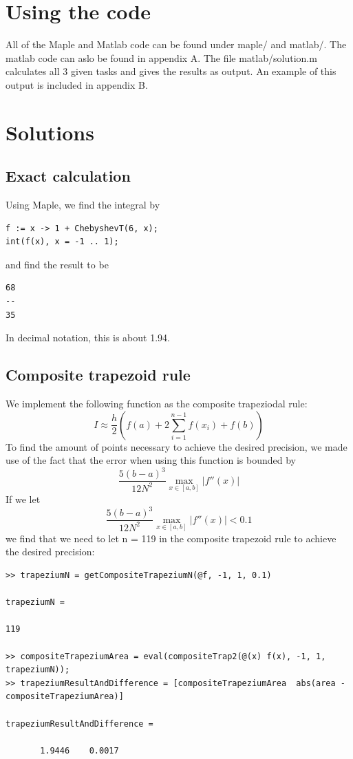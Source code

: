 \documentclass[11pt, a4paper, titlepage, openright]{article}
\begin{document}
\section{Using the code}
    All of the Maple and Matlab code can be found under maple/ and matlab/. The matlab code can aslo be found in appendix A.
    The file matlab/solution.m calculates all 3 given tasks and gives the results as output. An example of this output is included in appendix B.

\newpage

\section{Solutions}
\subsection{Exact calculation}
Using Maple, we find the integral by

\begin{lstlisting}
f := x -> 1 + ChebyshevT(6, x);
int(f(x), x = -1 .. 1);
\end{lstlisting}
and find the result to be
\begin{lstlisting}
68
--
35
\end{lstlisting}
In decimal notation, this is about 1.94.


\subsection{Composite trapezoid rule}
We implement the following function as the composite trapeziodal rule:
\[ I \approx \frac{h}{2} (f(a) + 2 \sum_{i=1}^{n-1} f(x_i) + f(b)) \]
To find the amount of points necessary to achieve the desired precision, we made use of the fact that the error when using this function is bounded by
\[ \frac{5(b-a)^3}{12 N^2} \max_{x \in [a, b]} |f''(x)| \]
If we let
\[ \frac{5(b-a)^3}{12 N^2} \max_{x \in [a, b]} |f''(x)| < 0.1 \]
we find that we need to let n = 119 in the composite trapezoid rule to achieve the desired precision:
\begin{lstlisting}
>> trapeziumN = getCompositeTrapeziumN(@f, -1, 1, 0.1)

trapeziumN =

119

>> compositeTrapeziumArea = eval(compositeTrap2(@(x) f(x), -1, 1, trapeziumN));
>> trapeziumResultAndDifference = [compositeTrapeziumArea  abs(area - compositeTrapeziumArea)]

trapeziumResultAndDifference =

       1.9446    0.0017
\end{lstlisting}
\end{document}
